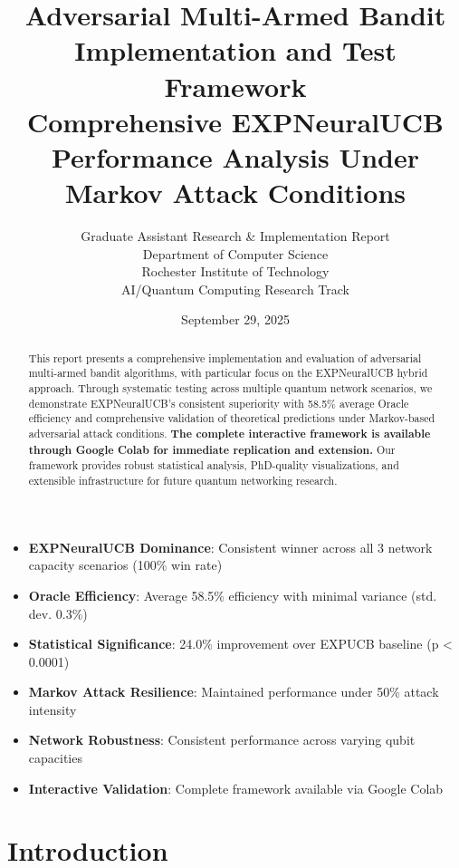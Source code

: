 \documentclass[11pt,a4paper]{article}
\title{\textbf{Adversarial Multi-Armed Bandit Implementation and Test Framework}\\ 
\large{Comprehensive EXPNeuralUCB Performance Analysis Under Markov Attack Conditions}}
\author{Graduate Assistant Research \& Implementation Report\\ 
Department of Computer Science \\ 
Rochester Institute of Technology \\ 
AI/Quantum Computing Research Track}
\date{September 29, 2025}
\newcommand{\performance}[1]{\textcolor{performancecolor}{\textbf{#1}}}
\newcommand{\stochastic}[1]{\textcolor{stochasticcolor}{\textbf{#1}}}
\newcommand{\critical}[1]{\textcolor{criticalcolor}{\textbf{#1}}}
\newcommand{\success}[1]{\textcolor{successcolor}{\textbf{#1}}}
\newcommand{\colab}[1]{\textcolor{colabcolor}{\textbf{#1}}}
\begin{document}
\maketitle

\begin{abstract}
This report presents a comprehensive implementation and evaluation of adversarial multi-armed bandit algorithms, with particular focus on the EXPNeuralUCB hybrid approach. Through systematic testing across multiple quantum network scenarios, we demonstrate EXPNeuralUCB's consistent superiority with 58.5\% average Oracle efficiency and comprehensive validation of theoretical predictions under Markov-based adversarial attack conditions. \colab{The complete interactive framework is available through Google Colab for immediate replication and extension.} Our framework provides robust statistical analysis, PhD-quality visualizations, and extensible infrastructure for future quantum networking research.
\end{abstract}

\newpage

{\small\tableofcontents}

\newpage

\begin{tcolorbox}[colback=highlightcolor!30,colframe=performancecolor,title=\textbf{Key Experimental Results Summary}]
\begin{itemize}
\item \performance{EXPNeuralUCB Dominance}: Consistent winner across all 3 network capacity scenarios (100\% win rate)
\item \performance{Oracle Efficiency}: Average 58.5\% efficiency with minimal variance (std. dev. 0.3\%)
\item \success{Statistical Significance}: 24.0\% improvement over EXPUCB baseline (p < 0.0001)
\item \critical{Markov Attack Resilience}: Maintained performance under 50\% attack intensity
\item \stochastic{Network Robustness}: Consistent performance across varying qubit capacities
\item \colab{Interactive Validation}: Complete framework available via Google Colab
\end{itemize}
\end{tcolorbox}

\section{Introduction}
\end{document}
